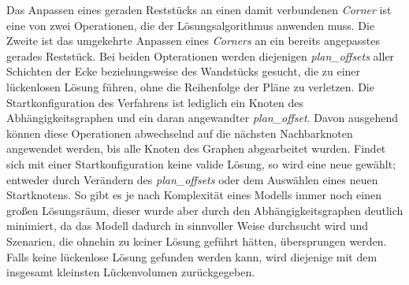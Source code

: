 Das Anpassen eines geraden Reststücks an einen damit verbundenen \textit{Corner} ist eine von zwei Operationen, die der Lösungsalgorithmus anwenden muss.
Die Zweite ist das umgekehrte Anpassen eines \textit{Corners} an ein bereits angepasstes gerades Reststück.
Bei beiden Opterationen werden diejenigen \textit{plan\_offsets} aller Schichten der Ecke beziehungsweise des Wandstücks gesucht, die zu einer lückenlosen Lösung führen, ohne die Reihenfolge der Pläne zu verletzen.
Die Startkonfiguration des Verfahrens ist lediglich ein Knoten des Abhängigkeitsgraphen und ein daran angewandter \textit{plan\_offset}.
Davon ausgehend können diese Operationen abwechselnd auf die nächsten Nachbarknoten angewendet werden, bis alle Knoten des Graphen abgearbeitet wurden.
Findet sich mit einer Startkonfiguration keine valide Lösung, so wird eine neue gewählt; entweder durch Verändern des \textit{plan\_offsets} oder dem Auswählen eines neuen Startknotens.
So gibt es je nach Komplexität eines Modells immer noch einen großen Lösungsräum, dieser wurde aber durch den Abhängigkeitsgraphen deutlich minimiert, da das Modell dadurch in sinnvoller Weise durchsucht wird und Szenarien, die ohnehin zu keiner Lösung geführt hätten, übersprungen werden.
Falls keine lückenlose Lösung gefunden werden kann, wird diejenige mit dem insgesamt kleinsten Lückenvolumen zurückgegeben.

